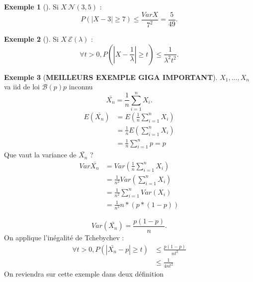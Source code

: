 \documentclass{article}
\theoremstyle{plain}%
\theoremstyle{definition}
\newtheorem{exmp}{Exemple}[section]
\theoremstyle{remark}
\begin{document}
\begin{exmp}[]
    Si $ X ~ \mathcal{N}(3,5) $ : 
    \[
        P(\left| X-3 \right| \geq 7) \leq \frac{Var X}{7^2} = \frac{5}{49}
    .\]    
\end{exmp}
\begin{exmp}[]
    Si $ X ~ \mathcal{E}(\lambda )  $ : 
    \[
        \forall t>0, P(\left| X-\frac{1}{\lambda } \right| \geq t) \leq \frac{1}{\lambda ^2 t^2}
    .\]
\end{exmp}
\begin{exmp}[\textbf{MEILLEURS EXEMPLE GIGA IMPORTANT}]
    $ X_1, ... ,X_n $ va iid de loi $ \mathcal{B}(p) p$ inconnu 
    \[
        \bar{X_n} = \frac{1}{n}\sum_{i=1}^{n}X_i
    .\]
    \begin{align*}
        E(\bar{X_n}) &= E(\frac{1}{n}\sum_{i=1}^{n}X_i) \\
                    &= \frac{1}{n} E(\sum_{i=1}^{n}X_i) \\
                    &= \frac{1}{n}\sum_{i=1}^{n}p = p
    \end{align*}
    Que vaut la variance de $ \bar{X_n} $ ?
    \begin{align*}
        Var \bar{X_n} &= Var (\frac{1}{n} \sum_{i=1}^{n}X_i) \\
                    &= \frac{1}{n^2} Var(\sum_{i=1}^{n}X_i) \\
                    &= \frac{1}{n^2}\sum_{i=1}^{n}Var(X_i) \\
                    &= \frac{1}{n^2}n*(p*(1-p))
    \end{align*}
    
    \[
        Var(\bar{X_n}) = \frac{p(1-p)}{n}
    .\]
    On applique l'inégalité de Tchebychev : 
    \begin{align*}
        \forall t>0, P(\left| \bar{X_n}-p \right|  \geq t) & \leq \frac{p(1-p)}{nt^2} \\
                & \leq \frac{1}{4nt^2}
    \end{align*}
    On reviendra sur cette exemple dans deux définition
\end{exmp}
    
\end{document}
